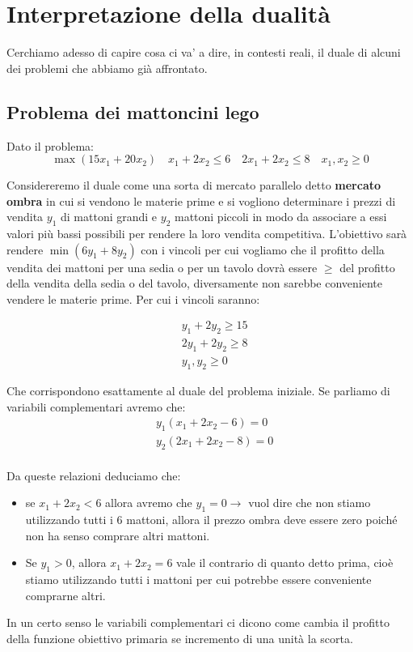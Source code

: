 \section{Interpretazione della dualità}
Cerchiamo adesso di capire cosa ci va' a dire, in contesti reali, il duale di alcuni dei problemi che abbiamo già affrontato.
\subsection{Problema dei mattoncini lego}
Dato il problema:
\[\max(15x_1+20x_2) \quad x_1+2x_2\leq 6 \quad 2x_1+2x_2 \leq 8 \quad x_1,x_2 \geq
0\]

Considereremo il duale come una sorta di mercato parallelo detto \textbf{mercato ombra} in cui si  vendono le materie prime e si vogliono determinare i prezzi di vendita $y_1$ di mattoni grandi e $y_2$ mattoni piccoli in modo da associare a essi valori più bassi possibili per rendere la loro vendita competitiva. L'obiettivo sarà rendere $\min(6y_1+8y_2)$ con i vincoli per cui vogliamo che il profitto della vendita dei mattoni per una sedia o per un tavolo dovrà essere $\geq$ del profitto della vendita della sedia o del tavolo,  diversamente non sarebbe conveniente vendere le materie prime. Per cui i vincoli saranno:

\begin{align*}
    &y_1+2y_2 \geq 15\\
    &2y_1+2y_2 \geq 8\\
    &y_1,y_2 \geq 0
\end{align*}

Che corrispondono esattamente al duale del problema iniziale. Se parliamo di variabili complementari avremo che:
\begin{align*}
    &y_1(x_1+2x_2-6)=0\\
    &y_2(2x_1+2x_2 - 8) = 0\\ 
\end{align*}

Da queste relazioni deduciamo che: 
\begin{itemize}
    \item se $x_1+2x_2 < 6$ allora avremo che $y_1 = 0 \xrightarrow{}$ vuol dire che non stiamo utilizzando tutti i 6 mattoni, allora il prezzo ombra deve essere zero poiché non ha senso comprare altri mattoni.
    \item Se $y_1 > 0$, allora $x_1+2x_2 = 6$ vale il contrario di quanto detto prima, cioè stiamo utilizzando tutti i mattoni per cui potrebbe essere conveniente comprarne altri.
\end{itemize}
In un certo senso le variabili complementari ci dicono come cambia il profitto della funzione obiettivo primaria se incremento di una unità la scorta.

